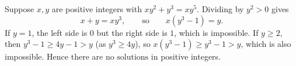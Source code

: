 Suppose $x,y$ are positive integers with $xy^2+y^3=xy^5$. Dividing by $y^2>0$ gives
\[x+y=xy^3,\qquad\text{so}\qquad x\left(y^3-1\right)=y.\]
If $y=1$, the left side is $0$ but the right side is $1$, which is impossible. If $y\ge2$, then $y^3-1\ge4y-1>y$ (as $y^3\ge4y$), so $x\left(y^3-1\right)\ge y^3-1>y$, which is also impossible. Hence there are $\boxed{\text{no solutions}}$ in positive integers.
